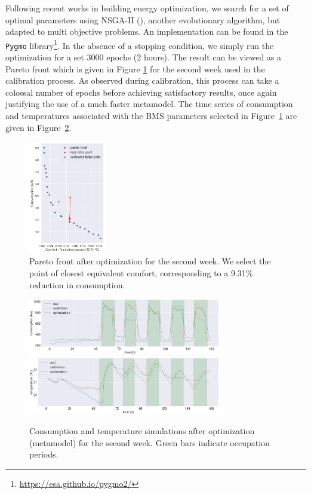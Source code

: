 \documentclass[12pt]{article}
\begin{document}
Following recent works in building energy optimization, we search for a set of optimal parameters using NSGA-II (\cite{Deb2000AFE}), another evolutionary algorithm, but adapted to multi objective problems. An implementation can be found in the \texttt{Pygmo} library\footnote{\href{https://esa.github.io/pygmo2/}{https://esa.github.io/pygmo2/}}. In the absence of a stopping condition, we simply run the optimization for a set 3000 epochs (2 hours). The result can be viewed as a Pareto front which is given in Figure \ref{fig:pareto} for the second week used in the calibration process. As observed during calibration, this process can take a colossal number of epochs before achieving satisfactory results, once again justifying the use of a much faster metamodel. The time series of consumption and temperatures associated with the BMS parameters selected in Figure~\ref{fig:pareto} are given in Figure~\ref{fig:timeseriesafteroptim}.

\begin{figure}
    \centering
    \includegraphics[width=0.3\textwidth]{pareto_week2.png}
    \caption{Pareto front after optimization for the second week. We select the point of closest equivalent comfort, corresponding to a 9.31\% reduction in consumption.}
    \label{fig:pareto}
\end{figure}


\begin{figure}
    \centering
    \includegraphics[width=0.75\textwidth]{optim_week2_private.png}
    \includegraphics[width=0.75\textwidth]{optim_week2_t_int.png}
    \caption{Consumption and temperature simulations after optimization (metamodel) for the second week. Green bars indicate occupation periods.} %
    \label{fig:timeseriesafteroptim}
\end{figure}
\end{document}
